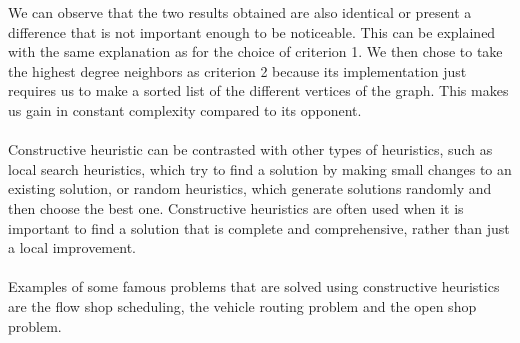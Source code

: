     We can observe that the two results obtained are also identical or present a difference that is not important enough to be noticeable. This can be explained with the same explanation as for the choice of criterion 1. We then chose to take the highest degree neighbors as criterion 2 because its implementation just requires us to make a sorted list of the different vertices of the graph. This makes us gain in constant complexity compared to its opponent.
    \\ \\
    Constructive heuristic can be contrasted with other types of heuristics, such as local search heuristics, which try to find a solution by making small changes to an existing solution, or random heuristics, which generate solutions randomly and then choose the best one. Constructive heuristics are often used when it is important to find a solution that is complete and comprehensive, rather than just a local improvement.
    \\ \\
    Examples of some famous problems that are solved using constructive heuristics are the flow shop scheduling, the vehicle routing problem and the open shop problem.
    
    